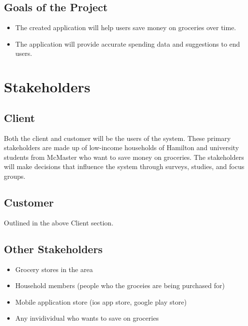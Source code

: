 \documentclass[12pt]{article}
\begin{document}
\subsection{Goals of the Project}
\begin{itemize}
  \item The created application will help users save money on groceries over time.
  \item The application will provide accurate spending data and suggestions to end users.
\end{itemize}  
\section{Stakeholders}
\subsection{Client}
Both the client and customer will be the users of the system. These primary stakeholders are made up of low-income households of Hamilton and university students from McMaster who want to save money on groceries. The stakeholders will make decisions that influence the system through surveys, studies, and focus groups.
\subsection{Customer}
Outlined in the above Client section.
\subsection{Other Stakeholders}
\begin{itemize}
  \item Grocery stores in the area
  \item Household members (people who the groceies are being purchased for)
  \item Mobile application store (ios app store, google play store)
  \item Any invidividual who wants to save on groceries
\end{itemize}
\end{document}
